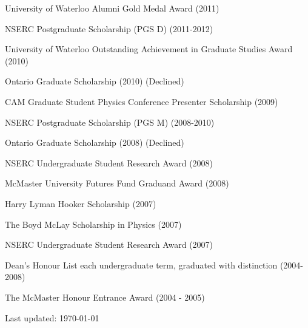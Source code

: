 \documentclass[letterpaper]{article}
\def\footerlink{http://jblevins.org/projects/cv-template/}
\renewenvironment{itemize}{
  \begin{list}{}{
    \setlength{\leftmargin}{1.5em}
  }
}{
  \end{list}
}
\begin{document}
\begin{itemize}
\item University of Waterloo Alumni Gold Medal Award (2011)
\item NSERC Postgraduate Scholarship (PGS D) (2011-2012)
\item University of Waterloo Outstanding Achievement in Graduate Studies Award (2010)
\item Ontario Graduate Scholarship (2010) (Declined)
\item CAM Graduate Student Physics Conference Presenter Scholarship (2009)
\item NSERC Postgraduate Scholarship (PGS M) (2008-2010)
\item Ontario Graduate Scholarship (2008) (Declined)
\item NSERC Undergraduate Student Research Award (2008)
\item McMaster University Futures Fund Graduand Award (2008)
\item Harry Lyman Hooker Scholarship (2007)
\item The Boyd McLay Scholarship in Physics (2007)
\item NSERC Undergraduate Student Research Award (2007)
\item Dean's Honour List each undergraduate term, graduated with distinction (2004-2008)
\item The McMaster Honour Entrance Award (2004 - 2005)
\end{itemize}


\bigskip

\begin{center}
  \begin{footnotesize}
    Last updated: \today \\
  \end{footnotesize}
\end{center}
\end{document}
